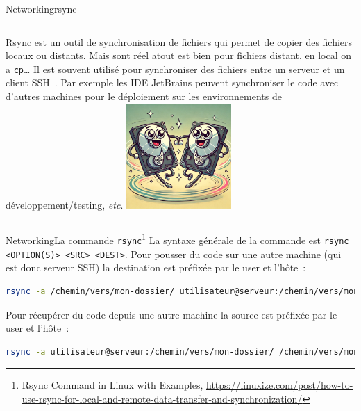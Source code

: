 \documentclass{beamer}
\begin{document}
    \begin{frame}{Networking}{rsync}
        \begin{columns}
            Rsync est un outil de synchronisation de fichiers qui permet de copier des fichiers locaux ou distants.
            Mais sont réel atout est bien pour fichiers distant, en local on a \lstinline{cp}\ldots
            \bigbreak
            Il est souvent utilisé pour synchroniser des fichiers entre un serveur et un client SSH~.
            \bigbreak
            Par exemple les IDE JetBrains peuvent synchroniser le code avec d'autres machines pour le déploiement sur les environnements de développement/testing, \textit{etc}.
            \centering
            \includegraphics[width=4cm]{image/hdd-synchronous}
        \end{columns}
    \end{frame}

    \begin{frame}[fragile]{Networking}{La commande \lstinline{rsync}\footnote{Rsync Command in Linux with Examples, \url{https://linuxize.com/post/how-to-use-rsync-for-local-and-remote-data-transfer-and-synchronization/}}}
        La syntaxe générale de la commande est \lstinline{rsync <OPTION(S)> <SRC> <DEST>}.
        Pour pousser du code sur une autre machine (qui est donc serveur SSH) la destination est préfixée par le user et l'hôte~:
        \bigbreak
        \begin{lstlisting}[language=bash]
rsync -a /chemin/vers/mon-dossier/ utilisateur@serveur:/chemin/vers/mon-dossier/
        \end{lstlisting}
        Pour récupérer du code depuis une autre machine la source est préfixée par le user et l'hôte~:
        \begin{lstlisting}[language=bash]
rsync -a utilisateur@serveur:/chemin/vers/mon-dossier/ /chemin/vers/mon-dossier/
        \end{lstlisting}
    \end{frame}
\end{document}
